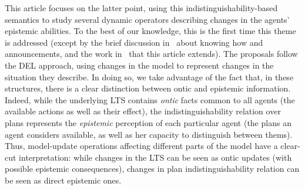 %
%
%



This article focuses on the latter point, using this in\-dis\-tin\-guisha\-bil\-i\-ty-based semantics to study several dynamic operators describing changes in the agents' epistemic abilities. To the best of our knowledge, this is the first time this theme is addressed (except by the brief discussion in~\cite{Wang2016} about knowing how and announcements, and the work in~\cite{AFSV22} that this article extends). The proposals follow the DEL approach, using changes in the model to represent changes in the situation they describe. In doing so, we take advantage of the fact that, in these structures, there is a clear distinction between ontic and epistemic information. Indeed, while the underlying LTS contains \emph{ontic} facts common to all agents (the available actions as well as their effect), the indistinguishability relation over plans represents the \emph{epistemic} perception of each particular agent (the plans an agent considers available, as well as her capacity to distinguish between thems). Thus, model-update operations affecting different parts of the model have a clear-cut interpretation: while changes in the LTS can be seen as ontic updates (with possible epistemic consequences), changes in plan indistinguishability relation can be seen as direct epistemic ones. 


